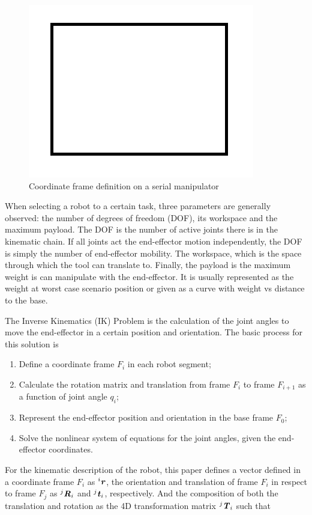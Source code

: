 \documentclass[11pt]{article}
\newcommand{\mbi}[1]{\textbf{\emph{#1}}}
\begin{document}
        \begin{figure}[h]
        \centering
        \includegraphics[width=0.35\linewidth]{img/sample}
        \caption{Coordinate frame definition on a serial manipulator}
        \label{fig:robot}
        \end{figure}
        
        When selecting a robot to a certain task, three parameters are generally observed: the number of degrees of freedom (DOF), its workspace and the maximum payload. The DOF is the number of active joints there is in the kinematic chain. If all joints act the end-effector motion independently, the DOF is simply the number of end-effector mobility. The workspace, which is the space through which the tool can translate to. Finally, the payload is the maximum weight is can manipulate with the end-effector. It is usually represented as the weight at worst case scenario position or given as a curve with weight vs distance to the base.
        
        The Inverse Kinematics (IK) Problem is the calculation of the joint angles to move the end-effector in a certain position and orientation. The basic process for this solution is
        
        \begin{enumerate}
        \item Define a coordinate frame $F_i$ in each robot segment;
        \item Calculate the rotation matrix and translation from frame $F_i$ to frame $F_{i+1}$ as a function of joint angle $q_i$;
        \item Represent the end-effector position and orientation in the base frame $F_0$;
        \item Solve the nonlinear system of equations for the joint angles, given the end-effector coordinates.
        \end{enumerate}
        
        For the kinematic description of the robot, this paper defines a vector defined in a coordinate frame $F_i$ as $^i\mbi{r}$, the orientation and translation of frame $F_i$ in respect to frame $F_j$ as $^j\mbi{R}_i$ and $^j\mbi{t}_i$, respectively. And the composition of both the translation and rotation as the 4D transformation matrix $^j\mbi{T}_i$ such that
        
\end{document}
